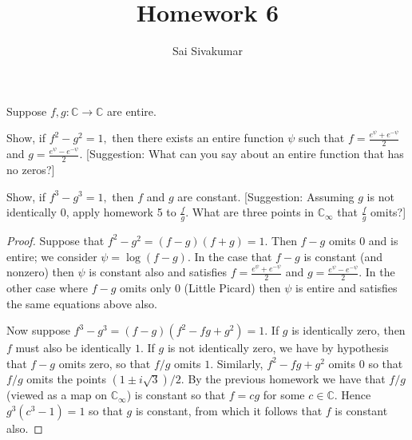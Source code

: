 \documentclass[12pt]{amsart}
\title{Homework 6}
\author{Sai Sivakumar}
\newcommand{\CC}{\mathbb{C}}
\begin{document}
\maketitle

\thispagestyle{empty}

Suppose $f,g:\CC\to\CC$ are entire. 

Show, if $f^2-g^2=1,$ then there exists an entire function $\psi$ such that $f=\frac{e^\psi + e^{-\psi}}{2}$ and $g=\frac{e^{\psi} - e^{-\psi}}{2}.$ [Suggestion: What can you say about an entire function that has no zeros?]

Show, if $f^3-g^3=1,$ then $f$ and $g$ are constant. [Suggestion: Assuming $g$ is not identically $0$, apply homework 5 to  $\frac{f}{g}$. What are three points in $\CC_\infty$ that $\frac{f}{g}$ omits?]

 \bigskip

\begin{proof}
\baselineskip=24pt
Suppose that $f^2-g^2 = (f-g)(f+g)=1$. Then $f-g$ omits $0$ and is entire; we consider $\psi = \log(f-g)$. In the case that $f-g$ is constant (and nonzero) then $\psi$ is constant also and satisfies $f= \frac{e^\psi + e^{-\psi}}{2}$ and $g=\frac{e^{\psi} - e^{-\psi}}{2}$. In the other case where $f-g$ omits only $0$ (Little Picard) then $\psi$ is entire and satisfies the same equations above also.

Now suppose $f^3-g^3 = (f-g)(f^2-fg+g^2) = 1$. If $g$ is identically zero, then $f$ must also be identically $1$. If $g$ is not identically zero, we have by hypothesis that $f-g$ omits zero, so that $f/g$ omits $1$. Similarly, $f^2-fg+g^2$ omits $0$ so that $f/g$ omits the points $(1\pm i\sqrt{3})/2$. By the previous homework we have that $f/g$ (viewed as a map on $\mathbb{C}_\infty$) is constant so that $f = cg$ for some $c\in \mathbb{C}$. Hence $g^3(c^3-1) = 1$ so that $g$ is constant, from which it follows that $f$ is constant also.
\end{proof}
\end{document}
